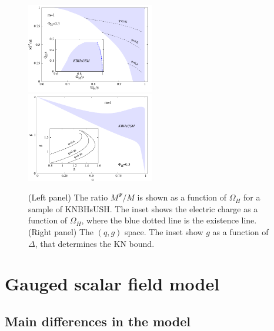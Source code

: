 \begin{figure}[H]
  \begin{center}
    \includegraphics[width=0.497\textwidth]{papers/KerrNewman/Mpsi}
      \includegraphics[width=0.497\textwidth]{papers/KerrNewman/qg}
  \end{center}
  \caption{(Left panel) The ratio $M^\Psi/M$ is shown as a function of $\Omega_H$ for a sample of KNBHsUSH. The inset shows the electric charge as a function of $\Omega_H$, where the blue dotted line is the existence line. 
	(Right panel)  The $(q,g)$ space. The inset show $g$ as a function of $\Delta$, that determines the KN bound.
}
\label{fig:w-g} 
\end{figure}

 
 


\section{Gauged scalar field model}
\label{sec_mod_g}




\subsection{Main differences in the model}


